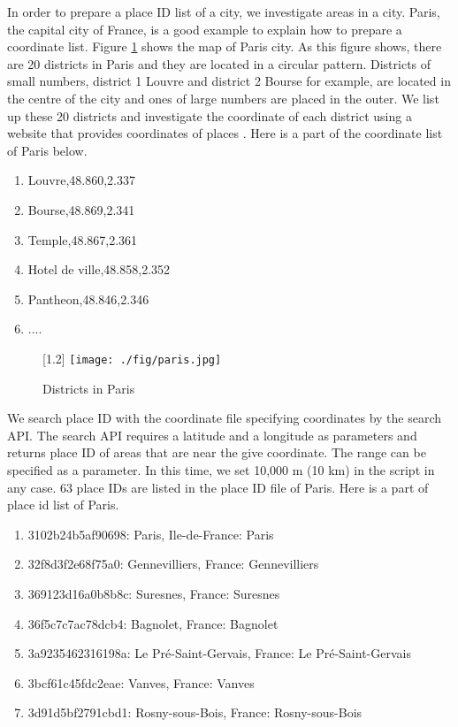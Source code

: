 In order to prepare a place ID list of a city, we investigate areas in a city.
Paris, the capital city of France, is a good example to explain how to prepare a coordinate list.
Figure \ref{fig:paris} shows the map of Paris city.
As this figure shows, there are 20 districts in Paris and they are located in a circular pattern.
Districts of small numbers, district 1 Louvre and district 2 Bourse for example, are located in the centre of the city and ones of large numbers are placed in the outer. 
We list up these 20 districts and investigate the coordinate of each district using a website that provides coordinates of places \cite{latitude}.
Here is a part of the coordinate list of Paris below.

\begin{enumerate}
	\item Louvre,48.860,2.337
	\item Bourse,48.869,2.341
	\item Temple,48.867,2.361
	\item Hotel de ville,48.858,2.352
	\item Pantheon,48.846,2.346
	\item ....
\end{enumerate}

\begin{figure}
	\centering
	\scalebox{1.2}[1.2]{
	\texttt{[image: ./fig/paris.jpg]}
	}
	\caption{Districts in Paris}
	\label{fig:paris}
\end{figure}

We search place ID with the coordinate file specifying coordinates by the search API.
The search API requires a latitude and a longitude as parameters and returns place ID of areas that are near the give coordinate. 
The range can be specified as a parameter.
In this time, we set 10,000 m (10 km) in the script in any case.
63 place IDs are listed in the place ID file of Paris.
Here is a part of place id list of Paris.

\begin{enumerate}
	\item 3102b24b5af90698: Paris, Ile-de-France: Paris
	\item 32f8d3f2e68f75a0: Gennevilliers, France: Gennevilliers
	\item 369123d16a0b8b8c: Suresnes, France: Suresnes
	\item 36f5c7c7ac78dcb4: Bagnolet, France: Bagnolet
	\item 3a9235462316198a: Le Pré-Saint-Gervais, France: Le Pré-Saint-Gervais
	\item 3bcf61c45fdc2eae: Vanves, France: Vanves
	\item 3d91d5bf2791cbd1: Rosny-sous-Bois, France: Rosny-sous-Bois
\end{enumerate}

